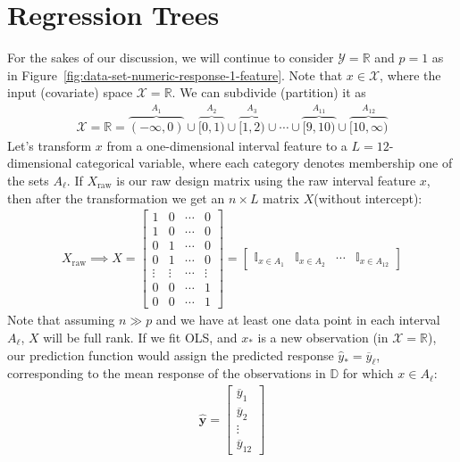 \documentclass[12pt, a4paper]{article}
\theoremstyle{definition}
\begin{document}
	\section*{Regression Trees}
	For the sakes of our discussion, we will continue to consider $\mathcal{Y}=\mathbb{R}$
	and $p=1$ as in Figure~\ref{fig:data-set-numeric-response-1-feature}. Note
	that $x\in \mathcal{X}$, where the input (covariate) space $\mathcal{X} = \mathbb{R}$.
	We can subdivide (partition) it as
	\begin{align*}
		\mathcal{X} = \mathbb{R} =
		\overbrace{(-\infty, 0)}^{A_1} \cup
		\overbrace{[0, 1)}^{A_2} \cup
		\overbrace{[1, 2)}^{A_3} \cup 
		\cdots \cup
		\overbrace{[9, 10)}^{A_{11}} \cup 
		\overbrace{[10, \infty)}^{A_{12}}
	\end{align*}
	Let's transform $x$ from a one-dimensional interval feature to
	a $L = 12$-dimensional categorical variable, where each category denotes
	membership one of the sets $A_\ell$. If $X_{\text{raw}}$ is our raw design
	matrix using the raw interval feature $x$, then after the transformation
	we get an $n\times L$ matrix $X$(without intercept):
	\begin{align*}
		X_{\text{raw}}\implies
		X = \begin{bmatrix}
			1 & 0 & \cdots & 0\\
			1 & 0 & \cdots & 0\\
			0 & 1 & \cdots & 0\\
			0 & 1 & \cdots & 0\\
			\vdots& \vdots & \cdots& \vdots\\
			0 & 0 & \cdots& 1\\
			0 & 0 & \cdots & 1
		\end{bmatrix} = \begin{bmatrix}
		\mathbb{I}_{x\in A_1} & \mathbb{I}_{x\in A_2} & \cdots & \mathbb{I}_{x\in A_{12}}
		\end{bmatrix}
	\end{align*}
	Note that assuming $n \gg p$ and we have at least one data point in each
	interval $A_\ell$, $X$ will be full rank. If we fit OLS, and $x_*$
	is a new observation (in $\mathcal{X}=\mathbb{R}$), our prediction function
	would assign the predicted response $\hat{y}_* = \overline{y}_\ell$,
	corresponding to the mean response of the observations in $\mathbb{D}$
	for which $x\in A_\ell$:
	\begin{align*}
		\hat{\bm{y}} = \begin{bmatrix}
			\overline{y}_1\\
			\overline{y}_2\\
			\vdots\\
			\overline{y}_{12}
		\end{bmatrix}
	\end{align*}
\end{document}
